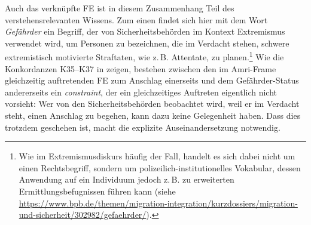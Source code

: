 Auch das verknüpfte FE  ist in diesem Zusammenhang Teil des verstehensrelevanten Wissens. Zum einen findet sich hier mit dem Wort \emph{Gefährder} ein Begriff, der von Sicherheitsbehörden im Kontext Extremismus verwendet wird, um Personen zu bezeichnen, die im Verdacht stehen, schwere extremistisch motivierte Straftaten, wie z.\,B. Attentate, zu planen.\footnote{Wie im Extremismusdiskurs häufig der Fall, handelt es sich dabei nicht um einen Rechtsbegriff, sondern um polizeilich-institutionelles Vokabular, dessen Anwendung auf ein Individuum jedoch z.\,B. zu erweiterten Ermittlungsbefugnissen führen kann (siehe \url{https://www.bpb.de/themen/migration-integration/kurzdossiers/migration-und-sicherheit/302982/gefaehrder/}).} Wie die Konkordanzen K35--K37 in  zeigen, bestehen zwischen den im Amri-Frame gleichzeitig auftretenden FE zum Anschlag einerseits und dem Gefährder-Status andererseits ein \emph{constraint}, der ein gleichzeitiges Auftreten eigentlich nicht vorsieht: Wer von den Sicherheitsbehörden beobachtet wird, weil er im Verdacht steht, einen Anschlag zu begehen, kann dazu keine Gelegenheit haben. Dass dies trotzdem geschehen ist, macht die explizite Auseinandersetzung notwendig.

